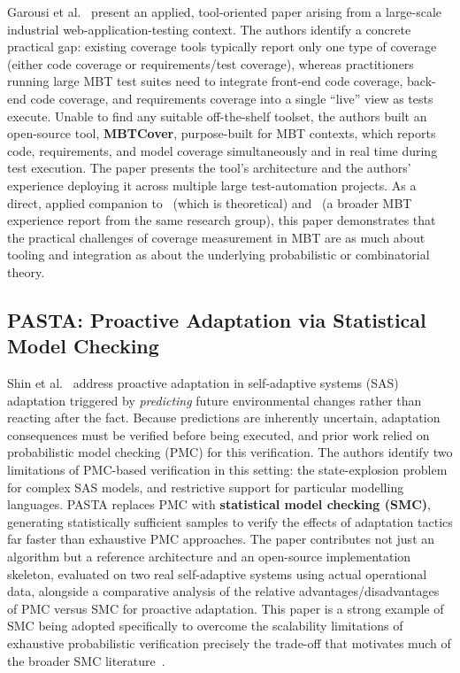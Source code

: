 Garousi et al.~\cite{garousi2024coverage} present an applied,
tool-oriented paper arising from a large-scale industrial
web-application-testing context.  The authors identify a concrete
practical gap: existing coverage tools typically report only one type of
coverage (either code coverage or requirements/test coverage), whereas
practitioners running large MBT test suites need to integrate front-end
code coverage, back-end code coverage, and requirements coverage into a
single ``live'' view as tests execute.  Unable to find any suitable
off-the-shelf toolset, the authors built an open-source tool,
\textbf{MBTCover}, purpose-built for MBT contexts, which reports code,
requirements, and model coverage simultaneously and in real time during
test execution.  The paper presents the tool's architecture and the
authors' experience deploying it across multiple large test-automation
projects.  As a direct, applied companion to~\cite{prasetya2021coverage}
(which is theoretical) and~\cite{garousi2021mbt_practice} (a broader MBT
experience report from the same research group), this paper demonstrates
that the practical challenges of coverage measurement in MBT are as much
about tooling and integration as about the underlying probabilistic or
combinatorial theory.




\subsection{PASTA: Proactive Adaptation via Statistical Model Checking}
\label{sec:lr_pasta}

Shin et al.~\cite{shin2021pasta} address proactive adaptation in
self-adaptive systems (SAS) adaptation triggered by \emph{predicting}
future environmental changes rather than reacting after the fact.
Because predictions are inherently uncertain, adaptation consequences
must be verified before being executed, and prior work relied on
probabilistic model checking (PMC) for this verification.  The authors
identify two limitations of PMC-based verification in this setting: the
state-explosion problem for complex SAS models, and restrictive support
for particular modelling languages.  PASTA replaces PMC with
\textbf{statistical model checking (SMC)}, generating statistically
sufficient samples to verify the effects of adaptation tactics far faster
than exhaustive PMC approaches.  The paper contributes not just an
algorithm but a reference architecture and an open-source implementation
skeleton, evaluated on two real self-adaptive systems using actual
operational data, alongside a comparative analysis of the relative
advantages/disadvantages of PMC versus SMC for proactive adaptation.
This paper is a strong example of SMC being adopted specifically to
overcome the scalability limitations of exhaustive probabilistic
verification precisely the trade-off that motivates much of the broader
SMC literature~\cite{agha2018survey, legay2010smc, larsen2014smc}.

